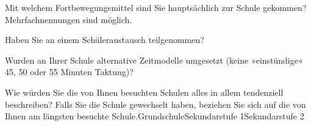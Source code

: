 \vspace{-.15cm}
\separate
\vspace{-.15cm}

\begin{choicegroup}{Mit welchem Fortbewegungsmittel sind Sie hauptsächlich zur Schule gekommen?
\newline\footnotesize{Mehrfachnennungen sind möglich.}}

\end{choicegroup}

\vspace{-.15cm}
\separate
\vspace{-.15cm}

\begin{choicequestion}[1]{Haben Sie an einem Schüleraustausch teilgenommen?}
\end{choicequestion}

\vspace{-.15cm}
\separate
\vspace{-.15cm}

\begin{choicequestion}[1]{Wurden an Ihrer Schule alternative Zeitmodelle umgesetzt (keine »einstündige« 45, 50 oder 55 Minuten Taktung)?}
\end{choicequestion}

\vspace{-.15cm}
\separate
\vspace{-.15cm}

\begin{markgroupThree}{Wie würden Sie die von Ihnen besuchten Schulen alles in allem tendenziell beschreiben?
	\newline\footnotesize Falls Sie die Schule gewechselt haben, beziehen Sie sich auf die von Ihnen am längsten besuchte Schule.}{Grundschule}{Sekundarstufe 1}{Sekundarstufe 2}
\end{markgroupThree}%

